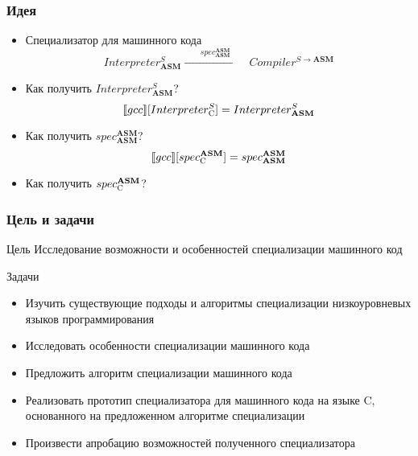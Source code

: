 \documentclass{beamer}
\begin{document}
\begin{frame}\frametitle{Идея}
  \begin{itemize}
  \item {Специализатор для машинного кода
      $$Interpreter^{S}_{\mathbf{ASM}}
      \xrightarrow{\qquad spec^{ \mathbf{ASM}}_{\mathbf{ASM}}\qquad} Compiler^{S \to \mathbf{ASM}}$$
    }
    \vfill
  \item {Как получить $Interpreter^{S}_{\mathbf{ASM}}$?
      $$\llbracket gcc \rrbracket [Interpreter^{S}_{\textsc{C}}] =
      Interpreter^{S}_{\mathbf{ASM}}$$}
    \vfill
  \item {Как получить $spec^{\mathbf{ASM}}_{\mathbf{ASM}}$?
      $$\llbracket gcc \rrbracket [spec^{ \mathbf{ASM}}_{\textsc{C}}] =
      spec^{\mathbf{ASM}}_{\mathbf{ASM}}$$}
    \vfill
  \item{Как получить $spec^{\mathbf{ASM}}_{\textsc{C}}$?}
    \vfill
  \end{itemize}
\end{frame}

\begin{frame}\frametitle{Цель и задачи}
\begin{block}{Цель}
Исследование возможности и особенностей специализации машинного код
\end{block}
\begin{block}{Задачи}
\footnotesize{
\begin{itemize}
\item Изучить существующие подходы и алгоритмы специализации низкоуровневых языков программирования
\item Исследовать особенности специализации машинного кода
\item Предложить алгоритм специализации машинного кода
\item Реализовать прототип специализатора для машинного кода на языке C, основанного на предложенном алгоритме специализации
\item Произвести апробацию возможностей полученного специализатора
\end{itemize}
}
\end{block}
\end{frame}
\end{document}
